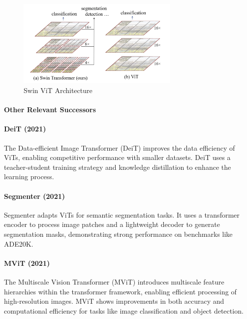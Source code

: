 \documentclass[12pt]{article}
\begin{document}
\begin{figure}[h]
    \centering
    \includegraphics[width=0.7\textwidth]{./media/swin_vit.png}
    \caption{Swin ViT Architecture}
    \label{fig:vit}
\end{figure}

\paragraph{Other Relevant Successors}

\paragraph{DeiT (2021)}

The Data-efficient Image Transformer (DeiT) improves the data efficiency of ViTs, enabling competitive performance with smaller datasets. DeiT uses a teacher-student training strategy and knowledge distillation to enhance the learning process.

\paragraph{Segmenter (2021)}

Segmenter adapts ViTs for semantic segmentation tasks. It uses a transformer encoder to process image patches and a lightweight decoder to generate segmentation masks, demonstrating strong performance on benchmarks like ADE20K.

\paragraph{MViT (2021)}

The Multiscale Vision Transformer (MViT) introduces multiscale feature hierarchies within the transformer framework, enabling efficient processing of high-resolution images. MViT shows improvements in both accuracy and computational efficiency for tasks like image classification and object detection.
\end{document}
